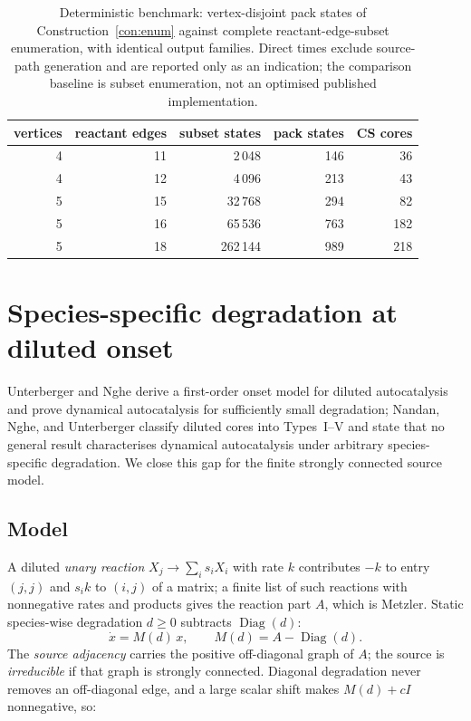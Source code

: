 \documentclass[11pt,a4paper]{article}
\theoremstyle{plain}
\theoremstyle{definition}
\theoremstyle{remark}
\newcommand{\Diag}{\operatorname{Diag}}
\begin{document}
\begin{table}[t]
\centering
\caption{Deterministic benchmark: vertex-disjoint pack states of Construction~\ref{con:enum} against complete reactant-edge-subset enumeration, with identical output families. Direct times exclude source-path generation and are reported only as an indication; the comparison baseline is subset enumeration, not an optimised published implementation.}
\label{tab:cs-bench}
\begin{tabular}{rrrrr}
\toprule
vertices & reactant edges & subset states & pack states & CS cores \\
\midrule
4 & 11 & 2\,048 & 146 & 36 \\
4 & 12 & 4\,096 & 213 & 43 \\
5 & 15 & 32\,768 & 294 & 82 \\
5 & 16 & 65\,536 & 763 & 182 \\
5 & 18 & 262\,144 & 989 & 218 \\
\bottomrule
\end{tabular}
\end{table}

\section{Species-specific degradation at diluted onset}\label{sec:deg}

Unterberger and Nghe \cite{unterberger2022} derive a first-order onset model for diluted autocatalysis and prove dynamical autocatalysis for sufficiently small degradation; Nandan, Nghe, and Unterberger \cite{nandan2026} classify diluted cores into Types~I--V and state that no general result characterises dynamical autocatalysis under arbitrary species-specific degradation. We close this gap for the finite strongly connected source model.

\subsection{Model}

A diluted \emph{unary reaction} $X_j\to\sum_i s_i X_i$ with rate $k$ contributes $-k$ to entry $(j,j)$ and $s_i k$ to $(i,j)$ of a matrix; a finite list of such reactions with nonnegative rates and products gives the reaction part $A$, which is Metzler. Static species-wise degradation $d\ge 0$ subtracts $\Diag(d)$:
\[
\dot x=M(d)\,x,\qquad M(d)=A-\Diag(d).
\]
The \emph{source adjacency} carries the positive off-diagonal graph of $A$; the source is \emph{irreducible} if that graph is strongly connected. Diagonal degradation never removes an off-diagonal edge, and a large scalar shift makes $M(d)+cI$ nonnegative, so:
\end{document}
